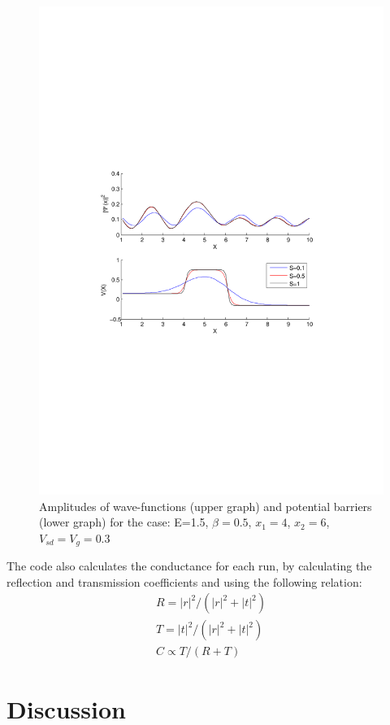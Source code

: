 \documentclass[a4paper]{article}
\begin{document}
\begin{figure}[h!]
\centering
\includegraphics[scale=0.85, trim = 35mm 101mm 35mm 100mm, clip]{test3}
\caption{Amplitudes of wave-functions (upper graph) and potential barriers (lower graph) for the case: E=1.5, $\beta=0.5$, $x_1=4$, $x_2=6$, $V_{sd}=V_g=0.3$}
\label{fig:test3}
\end{figure}

The code also calculates the conductance for each run, by calculating the reflection and transmission coefficients and using the following relation:
\begin{eqnarray*}
R=|r|^2/(|r|^2+|t|^2)\\
T=|t|^2/(|r|^2+|t|^2)\\
C \propto T/(R+T)
\end{eqnarray*}

\section{Discussion}
\end{document}
